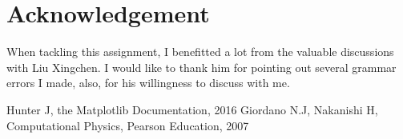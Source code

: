 \documentclass[10pt,a4paper]{article}
\begin{document}
	
    \section*{Acknowledgement}
    When tackling this assignment, I benefitted a lot from the valuable discussions with Liu Xingchen. I would like to thank him for pointing out several grammar errors I made, also, for his willingness to discuss with me.
    
    \begin{thebibliography}{99}
    	\bibitem{}Hunter J, the Matplotlib Documentation, 2016
    	\bibitem{}Giordano N.J, Nakanishi H, Computational Physics, Pearson Education, 2007
    \end{thebibliography} 
\end{document}
